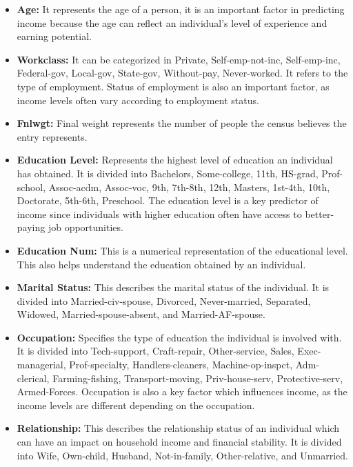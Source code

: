 \documentclass[10pt,journal,compsoc]{IEEEtran}
\begin{document}
\begin{itemize}
    \item \textbf{Age:} It represents the age of a person, it is an important factor in predicting income because the age can reflect an individual's level of experience and earning potential.

    \item \textbf{Workclass:} It can be categorized in Private, Self-emp-not-inc, Self-emp-inc, Federal-gov, Local-gov, State-gov, Without-pay, Never-worked. It refers to the type of employment. Status of employment is also an important factor, as income levels often vary according to employment status.

    \item \textbf{Fnlwgt:} Final weight represents the number of people the census believes the entry represents.

    \item \textbf{Education Level:} Represents the highest level of education an individual has obtained. It is divided into Bachelors, Some-college, 11th, HS-grad, Prof-school, Assoc-acdm, Assoc-voc, 9th, 7th-8th, 12th, Masters, 1st-4th, 10th, Doctorate, 5th-6th, Preschool. The education level is a key predictor of income since individuals with higher education often have access to better-paying job opportunities.

    \item \textbf{Education Num:} This is a numerical representation of the educational level. This also helps understand the education obtained by an individual.

    \item \textbf{Marital Status:} This describes the marital status of the individual. It is divided into Married-civ-spouse, Divorced, Never-married, Separated, Widowed, Married-spouse-absent, and Married-AF-spouse.

    \item \textbf{Occupation:} Specifies the type of education the individual is involved with. It is divided into Tech-support, Craft-repair, Other-service, Sales, Exec-managerial, Prof-specialty, Handlers-cleaners, Machine-op-inspct, Adm-clerical, Farming-fishing, Transport-moving, Priv-house-serv, Protective-serv, Armed-Forces. Occupation is also a key factor which influences income, as the income levels are different depending on the occupation.

    \item \textbf{Relationship:} This describes the relationship status of an individual which can have an impact on household income and financial stability. It is divided into Wife, Own-child, Husband, Not-in-family, Other-relative, and Unmarried.


\end{itemize}
\end{document}
